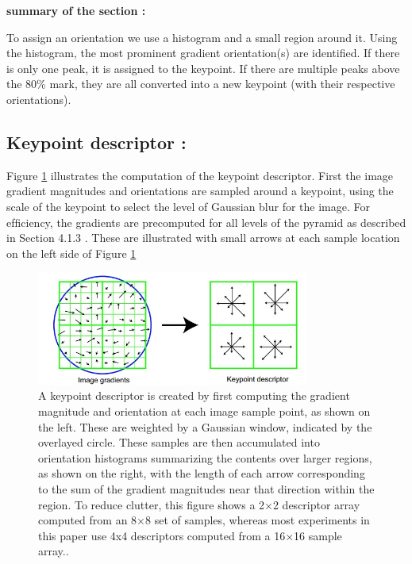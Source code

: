 \textbf{summary of the section :}

To assign an orientation we use a histogram and a small region around it. Using the histogram, the most prominent gradient orientation(s) are identified. If there is only one peak, it is assigned to the keypoint. If there are multiple peaks above the 80\% mark, they are all converted into a new keypoint (with their respective orientations).

\subsection{Keypoint descriptor :}

Figure \ref{fig:sift4} illustrates the computation of the keypoint descriptor. First the image gradient
magnitudes and orientations are sampled around a keypoint, using the scale of the keypoint
to select the level of Gaussian blur for the image. For efﬁciency, the gradients are precomputed
for all levels of the pyramid as described in Section 4.1.3 . These are illustrated with
small arrows at each sample location on the left side of Figure \ref{fig:sift4}

\begin{figure}[H]
\centering
\includegraphics[width=0.8\textwidth]{img/sift4.jpg}
\caption{ A keypoint descriptor is created by ﬁrst computing the gradient magnitude and orientation
at each image sample point, as shown on the left. These are weighted by a Gaussian window,
indicated by the overlayed circle. These samples are then accumulated into orientation histograms
summarizing the contents over larger regions, as shown on the right, with the length of each arrow
corresponding to the sum of the gradient magnitudes near that direction within the region. To reduce
clutter, this ﬁgure shows a 2$\times$2 descriptor array computed from an 8$\times$8 set of samples, whereas most
experiments in this paper use 4x4 descriptors computed from a 16$\times$16 sample array..}
\label{fig:sift4}
\end{figure}

